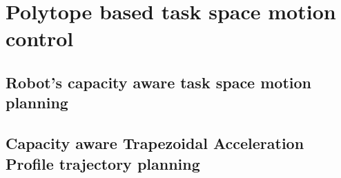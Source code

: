 \chapter{Polytope based task space motion control} %

\label{ch:motion_control} %


\section{Robot's capacity aware task space motion planning}
\section{Capacity aware Trapezoidal Acceleration Profile trajectory planning }